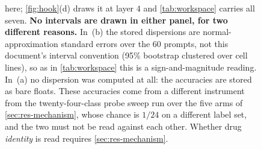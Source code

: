 \begin{figure}[htbp]
\begin{fullwidth}
{here; \cref{fig:hook}(d) draws it at layer $4$ and \cref{tab:workspace} carries
all seven. \textbf{No intervals are drawn in either panel, for two different
reasons.} In~(b) the stored dispersions are normal-approximation standard
errors over the $60$ prompts, not this document's interval convention (95\%
bootstrap clustered over cell lines), so as in \cref{tab:workspace} this is a
sign-and-magnitude reading. In~(a) no dispersion was computed at all: the
accuracies are stored as bare floats. These accuracies come from a different
instrument from the twenty-four-class probe sweep run over the five arms of
\cref{sec:res-mechanism}, whose chance is $1/24$ on a different label set, and
the two must not be read against each other. Whether drug \emph{identity} is
read requires \cref{sec:res-mechanism}.}
\label{fig:mechanism}
\end{fullwidth}
\end{figure}

